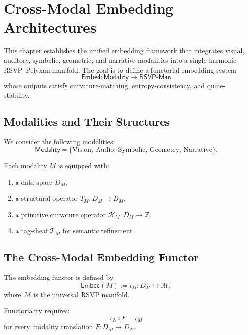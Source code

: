 \chapter{Cross-Modal Embedding Architectures}
\label{ch:59}

This chapter establishes the unified embedding framework that integrates
visual, auditory, symbolic, geometric, and narrative modalities into a single
harmonic RSVP--Polyxan manifold.  
The goal is to define a functorial embedding system
\[
\mathsf{Embed} : \mathsf{Modality} \to \mathsf{RSVP\text{-}Man}
\]
whose outputs satisfy curvature-matching, entropy-consistency, and
quine-stability.

\section{Modalities and Their Structures}
\label{sec:59:modalities}

We consider the following modalities:
\[
\mathsf{Modality} 
= \{ \mathrm{Vision},\ \mathrm{Audio},\ \mathrm{Symbolic},\ 
     \mathrm{Geometry},\ \mathrm{Narrative} \}.
\]

\begin{definition}
Each modality $M$ is equipped with:
\begin{enumerate}
  \item a data space $D_M$,
  \item a structural operator $T_M : D_M \to D_M$,
  \item a primitive curvature operator $\mathcal{H}_M : D_M \to \mathbb{Z}$,
  \item a tag-sheaf $\mathcal{T}_M$ for semantic refinement.
\end{enumerate}
\end{definition}

\section{The Cross-Modal Embedding Functor}
\label{sec:59:functor}

\begin{definition}
The embedding functor is defined by
\[
\mathsf{Embed}(M)
:= \iota_M : D_M \hookrightarrow \mathcal{M},
\]
where $\mathcal{M}$ is the universal RSVP manifold.
\end{definition}

Functoriality requires:
\[
\iota_{N} \circ F = \iota_{M}
\]
for every modality translation $F : D_M \to D_N$.

